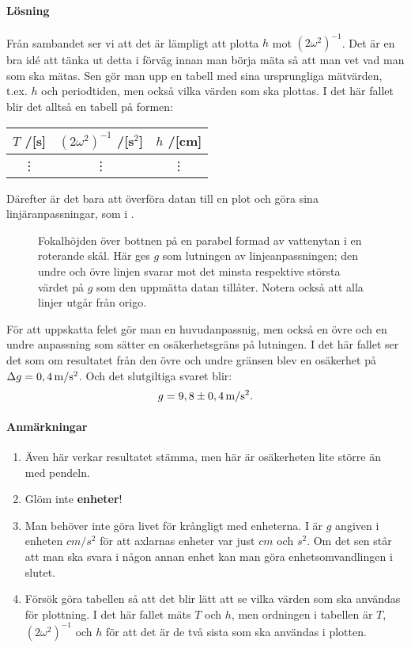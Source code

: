 \documentclass[11pt,a4paper, swedish
]{article}
\begin{document}
\paragraph{Lösning}
Från sambandet ser vi att det är lämpligt att plotta $h$ mot
$(2\omega^2)^{-1}$. Det är en bra idé att tänka ut detta i förväg
innan man börja mäta så att man vet vad man som ska mätas. Sen gör man
upp en tabell med sina ursprungliga mätvärden, t.ex. $h$ och
periodtiden, men också vilka värden som ska plottas. I det här fallet
blir det alltså en tabell på formen:
\vspace{-2mm}
\begin{center}
\begin{tabular}{|c|c|c|}\hline
  $T$ /[s] & $(2\omega^2)^{-1}$ /[s$^2$] & $h$ /[cm]
\\\hline
  \vdots&  \vdots&  \vdots 
\\\hline
\end{tabular}
\end{center}
Därefter är det bara att överföra datan till en plot och göra sina
linjäranpassningar, som i . 

\begin{figure}
\centering

\caption{Fokalhöjden över bottnen på en parabel formad av vattenytan i
en roterande skål. Här ges $g$ som lutningen av linjeanpassningen; den
undre och övre linjen svarar mot det minsta respektive största värdet
på $g$ som den uppmätta datan tillåter. Notera också att alla linjer
utgår från origo. }
\label{fig:vattenparabel}
\end{figure}

För att uppskatta felet gör man en huvudanpassnig, men också en övre
och en undre anpassning som sätter en osäkerhetsgräns på lutningen. I
det här fallet ser det som om resultatet från den övre och undre
gränsen blev en osäkerhet på $\Delta{g}=\unit[0,4]{m/s^2}$. Och det
slutgiltiga svaret blir:
\[g=\unit[9,8\pm0,4]{m/s^2}.\]

\paragraph{Anmärkningar}
\begin{enumerate}
\item Även här verkar resultatet stämma, men här är osäkerheten lite
  större än med pendeln. 
\item Glöm inte \textbf{enheter}!
\item Man behöver inte göra livet för krångligt med enheterna. I
   är $g$ angiven i enheten $\unit{cm/s^2}$
  för att axlarnas enheter var just $\unit{cm}$ och $\unit{s^2}$. Om
  det sen står att man ska svara i någon annan enhet kan man göra
  enhetsomvandlingen i slutet.
\item Försök göra tabellen så att det blir lätt att se vilka värden
  som ska användas för plottning. I det här fallet mäts $T$ och $h$,
  men ordningen i tabellen är $T$, $(2\omega^2)^{-1}$ och $h$ för att
  det är de två sista som ska användas i plotten. 
\end{enumerate}
\end{document}
